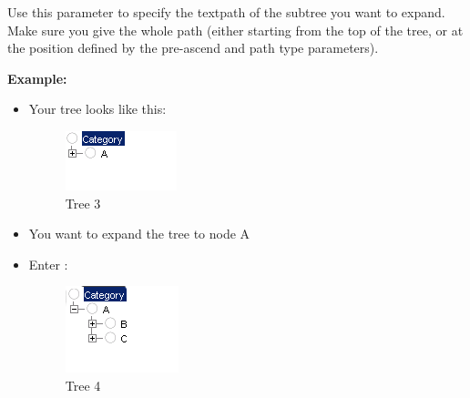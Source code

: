 
Use this parameter to specify the textpath of the subtree you want to expand. Make sure you give the whole path (either starting from the top of the tree, or at the position defined by the pre-ascend and path type parameters). 



\textbf{Example:}

\begin{itemize}
\item Your tree looks like this:

\begin{figure}
\begin{center}
\includegraphics{PS/Treeexample3}
\caption{Tree 3}
\label{treeexample3}
\end{center}
\end{figure}

\item You want to expand the tree to node A
\item Enter :

\begin{figure}
\begin{center}
\includegraphics{PS/Treeexample4}
\caption{Tree 4}
\label{treeexample4}
\end{center}
\end{figure}
\end{itemize}
